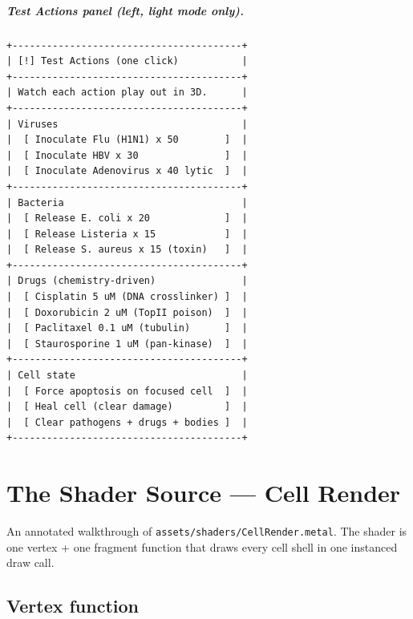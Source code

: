 \documentclass[11pt,letterpaper,twoside,openany]{book}
\newcommand{\file}[1]{\texttt{\small#1}}
\begin{document}
\paragraph{Test Actions panel (left, light mode only).}
\begin{verbatim}
+----------------------------------------+
| [!] Test Actions (one click)           |
+----------------------------------------+
| Watch each action play out in 3D.      |
+----------------------------------------+
| Viruses                                |
|  [ Inoculate Flu (H1N1) x 50        ]  |
|  [ Inoculate HBV x 30               ]  |
|  [ Inoculate Adenovirus x 40 lytic  ]  |
+----------------------------------------+
| Bacteria                               |
|  [ Release E. coli x 20             ]  |
|  [ Release Listeria x 15            ]  |
|  [ Release S. aureus x 15 (toxin)   ]  |
+----------------------------------------+
| Drugs (chemistry-driven)               |
|  [ Cisplatin 5 uM (DNA crosslinker) ]  |
|  [ Doxorubicin 2 uM (TopII poison)  ]  |
|  [ Paclitaxel 0.1 uM (tubulin)      ]  |
|  [ Staurosporine 1 uM (pan-kinase)  ]  |
+----------------------------------------+
| Cell state                             |
|  [ Force apoptosis on focused cell  ]  |
|  [ Heal cell (clear damage)         ]  |
|  [ Clear pathogens + drugs + bodies ]  |
+----------------------------------------+
\end{verbatim}

\chapter{The Shader Source --- Cell Render}
\label{ch:shader-cell}

An annotated walkthrough of \file{assets/shaders/CellRender.metal}.
The shader is one vertex + one fragment function that draws every
cell shell in one instanced draw call.

\section{Vertex function}
\end{document}
